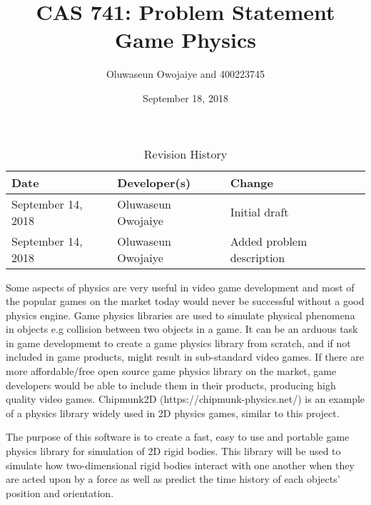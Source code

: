 \documentclass [12pt] {article}
\title{CAS 741: Problem Statement\\Game Physics}
\author{Oluwaseun Owojaiye and 400223745}
\date{September 18, 2018}
\begin{document}
\maketitle

\begin{table}[hp] \caption{Revision History} \label{TblRevisionHistory}
\begin{tabularx}{\textwidth}{llX} 
\toprule 
\textbf{Date} & \textbf{Developer(s)} & \textbf{Change}\\ 
\midrule September 14, 2018 & Oluwaseun Owojaiye & Initial draft\\ 
September 14, 2018 & Oluwaseun Owojaiye & Added problem description\\
\bottomrule 
\end{tabularx} 
\end{table}

Some aspects of physics are very useful in video game development and most of
the popular games on the market today would never be successful without a good
physics engine. Game physics libraries are used to simulate physical phenomena
in objects e.g collision between two objects in a game. It can be an arduous
task in game developmemt to create a game physics library from scratch, and if
not included in game products, might result in sub-standard video games. If
there are more affordable/free open source game physics library on the market,
game developers would be able to include them in their products, producing high
quality video games. Chipmunk2D (https://chipmunk-physics.net/) is an example of
a physics library widely used in 2D physics games, similar to this project.

The purpose of this software is to create a fast, easy to use and portable game
physics library for simulation of 2D rigid bodies. This library will be used to
simulate how two-dimensional rigid bodies interact with one another when they
are acted upon by a force as well as predict the time history of each objects'
position and orientation.
\end{document}
